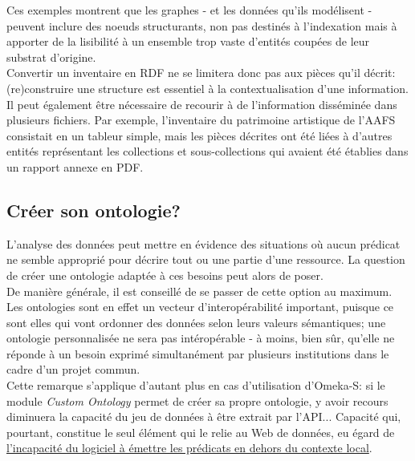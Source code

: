 \documentclass[a4paper,12pt,twoside]{book}
\begin{document}
Ces exemples montrent que les graphes - et les données qu'ils modélisent - peuvent inclure des noeuds structurants, non pas destinés à l'indexation mais à apporter de la lisibilité à un ensemble trop vaste d'entités coupées de leur substrat d'origine. \\

Convertir un inventaire en RDF ne se limitera donc pas aux pièces qu'il décrit: (re)construire une structure est essentiel à la contextualisation d'une information. Il peut également être nécessaire de recourir à de l'information disséminée dans plusieurs fichiers. Par exemple, l'inventaire du patrimoine artistique de l'AAFS consistait en un tableur simple, mais les pièces décrites ont été liées à d'autres entités représentant les collections et sous-collections qui avaient été établies dans un rapport annexe en PDF. 



\subsection{Créer son ontologie?}
L'analyse des données peut mettre en évidence des situations où aucun prédicat ne semble approprié pour décrire tout ou une partie d'une ressource. La question de créer une ontologie adaptée à ces besoins peut alors de poser.\\

De manière générale, il est conseillé de se passer de cette option au maximum. Les ontologies sont en effet un vecteur d'interopérabilité important, puisque ce sont elles qui vont ordonner des données selon leurs valeurs sémantiques; une ontologie personnalisée ne sera pas intéropérable - à moins, bien sûr, qu'elle ne réponde à un besoin exprimé simultanément par plusieurs institutions dans le cadre d'un projet commun.\\

Cette remarque s'applique d'autant plus en cas d'utilisation d'Omeka-S: si le module \textit{Custom Ontology} permet de créer sa propre ontologie, y avoir recours diminuera la capacité du jeu de données à être extrait par l'API... Capacité qui, pourtant, constitue le seul élément qui le relie au Web de données, eu égard de \hyperref[omeka-dans-wdd]{l'incapacité du logiciel à émettre les prédicats en dehors du contexte local}.\\
\end{document}
